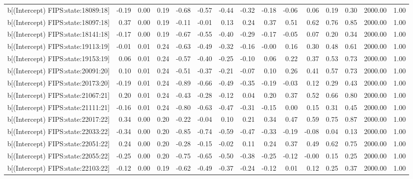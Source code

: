 \begin{table}[ht]
\begin{tabular}{rrrrrrrrrrrrrrr}
  b[(Intercept) FIPS:state:18089:18] & -0.19 & 0.00 & 0.19 & -0.68 & -0.57 & -0.44 & -0.32 & -0.18 & -0.06 & 0.06 & 0.19 & 0.30 & 2000.00 & 1.00 \\ 
  b[(Intercept) FIPS:state:18097:18] & 0.37 & 0.00 & 0.19 & -0.11 & -0.01 & 0.13 & 0.24 & 0.37 & 0.51 & 0.62 & 0.76 & 0.85 & 2000.00 & 1.00 \\ 
  b[(Intercept) FIPS:state:18141:18] & -0.17 & 0.00 & 0.19 & -0.67 & -0.55 & -0.40 & -0.29 & -0.17 & -0.05 & 0.07 & 0.20 & 0.34 & 2000.00 & 1.00 \\ 
  b[(Intercept) FIPS:state:19113:19] & -0.01 & 0.01 & 0.24 & -0.63 & -0.49 & -0.32 & -0.16 & -0.00 & 0.16 & 0.30 & 0.48 & 0.61 & 2000.00 & 1.00 \\ 
  b[(Intercept) FIPS:state:19153:19] & 0.06 & 0.01 & 0.24 & -0.57 & -0.40 & -0.25 & -0.10 & 0.06 & 0.22 & 0.37 & 0.53 & 0.73 & 2000.00 & 1.00 \\ 
  b[(Intercept) FIPS:state:20091:20] & 0.10 & 0.01 & 0.24 & -0.51 & -0.37 & -0.21 & -0.07 & 0.10 & 0.26 & 0.41 & 0.57 & 0.73 & 2000.00 & 1.00 \\ 
  b[(Intercept) FIPS:state:20173:20] & -0.19 & 0.01 & 0.24 & -0.89 & -0.66 & -0.49 & -0.35 & -0.19 & -0.03 & 0.12 & 0.29 & 0.43 & 2000.00 & 1.00 \\ 
  b[(Intercept) FIPS:state:21067:21] & 0.20 & 0.01 & 0.24 & -0.43 & -0.28 & -0.12 & 0.04 & 0.20 & 0.37 & 0.52 & 0.66 & 0.80 & 2000.00 & 1.00 \\ 
  b[(Intercept) FIPS:state:21111:21] & -0.16 & 0.01 & 0.24 & -0.80 & -0.63 & -0.47 & -0.31 & -0.15 & 0.00 & 0.15 & 0.31 & 0.45 & 2000.00 & 1.00 \\ 
  b[(Intercept) FIPS:state:22017:22] & 0.34 & 0.00 & 0.20 & -0.22 & -0.04 & 0.10 & 0.21 & 0.34 & 0.47 & 0.59 & 0.75 & 0.87 & 2000.00 & 1.00 \\ 
  b[(Intercept) FIPS:state:22033:22] & -0.34 & 0.00 & 0.20 & -0.85 & -0.74 & -0.59 & -0.47 & -0.33 & -0.19 & -0.08 & 0.04 & 0.13 & 2000.00 & 1.00 \\ 
  b[(Intercept) FIPS:state:22051:22] & 0.24 & 0.00 & 0.20 & -0.28 & -0.15 & -0.02 & 0.11 & 0.24 & 0.37 & 0.49 & 0.62 & 0.75 & 2000.00 & 1.00 \\ 
  b[(Intercept) FIPS:state:22055:22] & -0.25 & 0.00 & 0.20 & -0.75 & -0.65 & -0.50 & -0.38 & -0.25 & -0.12 & -0.00 & 0.15 & 0.25 & 2000.00 & 1.00 \\ 
  b[(Intercept) FIPS:state:22103:22] & -0.12 & 0.00 & 0.19 & -0.62 & -0.49 & -0.37 & -0.24 & -0.12 & 0.01 & 0.12 & 0.25 & 0.37 & 2000.00 & 1.00 \\ 

\end{tabular}
\end{table}
